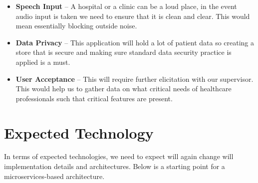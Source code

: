 \documentclass{article}
\begin{document}
\begin{itemize}
  \item \textbf{Speech Input} -- A hospital or a clinic can be a loud place, in the event audio input is taken we need to ensure that it is clean and clear. This would mean essentially blocking outside noise. 
  \item \textbf{Data Privacy} -- This application will hold a lot of patient data so creating a store that is secure and making sure standard data security practice is applied is a must.
  \item \textbf{User Acceptance} -- This will require further elicitation with our supervisor. This would help us to gather data on what critical needs of healthcare professionals such that critical features are present. 
\end{itemize}

\section{Expected Technology}

In terms of expected technologies, we need to expect will again change will implementation details and architectures. Below is a starting point for a microservices-based architecture.
\end{document}
